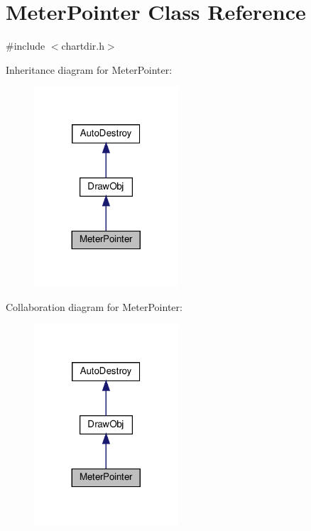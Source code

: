 \hypertarget{class_meter_pointer}{}\section{Meter\+Pointer Class Reference}
\label{class_meter_pointer}


{\ttfamily \#include $<$chartdir.\+h$>$}



Inheritance diagram for Meter\+Pointer\+:
\nopagebreak
\begin{figure}[H]
\begin{center}
\leavevmode
\includegraphics[width=152pt]{class_meter_pointer__inherit__graph}
\end{center}
\end{figure}


Collaboration diagram for Meter\+Pointer\+:
\nopagebreak
\begin{figure}[H]
\begin{center}
\leavevmode
\includegraphics[width=152pt]{class_meter_pointer__coll__graph}
\end{center}
\end{figure}
